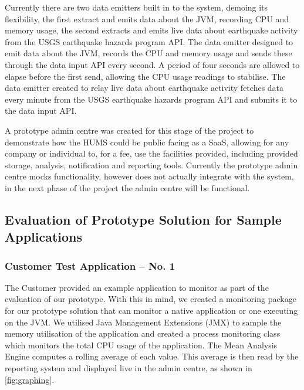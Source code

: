 \documentclass[10pt,a4paper]{article}
\begin{document}
Currently there are two data emitters built in to the system, demoing its flexibility, the first extract and emits data about the JVM, recording CPU and memory usage, the second extracts and emits live data about earthquake activity from the USGS earthquake hazards program API. %
The data emitter designed to emit data about the JVM, records the CPU and memory usage and sends these through the data input API every second. A period of four seconds are allowed to elapse before the first send, allowing the CPU usage readings to stabilise. The data emitter created to relay live data about earthquake activity fetches data every minute from the USGS earthquake hazards program API and submits it to the data input API.




A prototype admin centre was created for this stage of the project to demonstrate how the HUMS could be public facing as a SaaS, allowing for any company or individual to, for a fee, use the facilities provided, including provided storage, analysis, notification and reporting tools. Currently the prototype admin centre mocks functionality, however does not actually integrate with the system, in the next phase of the project the admin centre will be functional.

\subsection{Evaluation of Prototype Solution for Sample Applications}
\label{sec:prototype-evaluation}

\subsubsection{Customer Test Application -- No. 1}
The Customer provided an example application to monitor as part of the
evaluation of our prototype. With this in mind, we created a monitoring 
package for our prototype solution that can monitor a native application
or one executing on the JVM. We utilised Java Management 
Extensions (JMX) to sample the memory utilisation of the application and
created a process monitoring class which monitors the total
CPU usage of the application. The Mean Analysis Engine computes a 
rolling average of each value. This average is then read 
by the reporting system and displayed live in the admin centre, as shown
in \ref{fig:graphing}.
\end{document}
